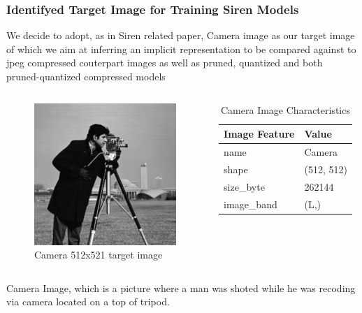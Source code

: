 



\begin{frame}
\frametitle{Identifyed Target Image for Training Siren Models}
We decide to adopt, as in Siren related paper, Camera image as our target image of which we aim at inferring an implicit representation to be compared against to jpeg compressed couterpart images as well as pruned, quantized and both pruned-quantized compressed models


\begin{columns}
\begin{figure}
\includegraphics[scale=0.2]{slides/experiments/target-image/cameramen_512x512.png}
\caption{Camera 512x521 target image}
\end{figure}

\begin{table}
\begin{tabular}{ll}
\hline
          Image Feature & Value \\
\hline
       name &      Camera \\
      shape &  (512, 512) \\
  size\_byte &      262144 \\
 image\_band &        (L,) \\
\hline
\end{tabular}
\caption{Camera Image Characteristics }
\end{table}

\end{columns}
Camera Image, which is a picture where a man was shoted while he was recoding via camera located on a top of tripod.
\end{frame}